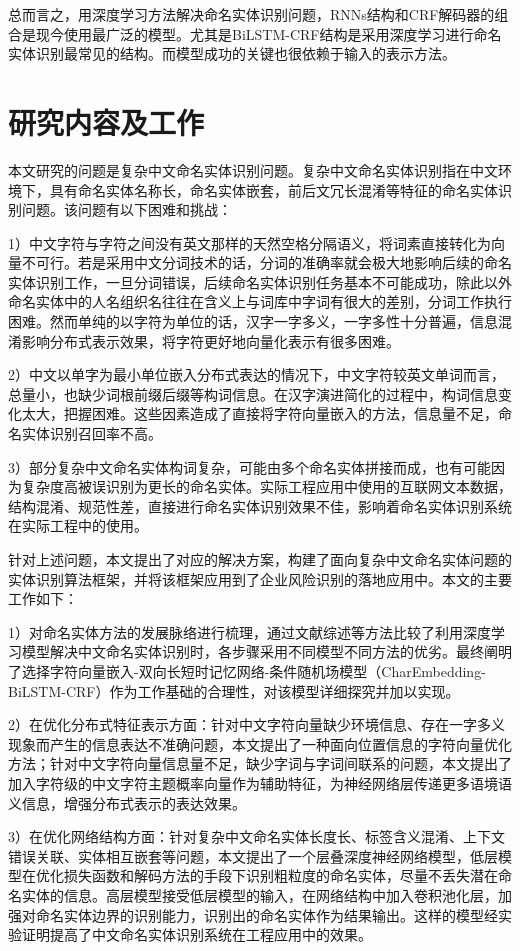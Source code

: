 \documentclass[winfonts,master,oneside,nobackinfo]{njuthesis}
\begin{document}
总而言之，用深度学习方法解决命名实体识别问题，RNNs结构和CRF解码器的组合是现今使用最广泛的模型。尤其是BiLSTM-CRF结构是采用深度学习进行命名实体识别最常见的结构。而模型成功的关键也很依赖于输入的表示方法。

\section{研究内容及工作}
本文研究的问题是复杂中文命名实体识别问题。复杂中文命名实体识别指在中文环境下，具有命名实体名称长，命名实体嵌套，前后文冗长混淆等特征的命名实体识别问题。该问题有以下困难和挑战：

1）中文字符与字符之间没有英文那样的天然空格分隔语义，将词素直接转化为向量不可行。若是采用中文分词技术的话，分词的准确率就会极大地影响后续的命名实体识别工作，一旦分词错误，后续命名实体识别任务基本不可能成功，除此以外命名实体中的人名组织名往往在含义上与词库中字词有很大的差别，分词工作执行困难。然而单纯的以字符为单位的话，汉字一字多义，一字多性十分普遍，信息混淆影响分布式表示效果，将字符更好地向量化表示有很多困难。

2）中文以单字为最小单位嵌入分布式表达的情况下，中文字符较英文单词而言，总量小，也缺少词根前缀后缀等构词信息。在汉字演进简化的过程中，构词信息变化太大，把握困难。这些因素造成了直接将字符向量嵌入的方法，信息量不足，命名实体识别召回率不高。

3）部分复杂中文命名实体构词复杂，可能由多个命名实体拼接而成，也有可能因为复杂度高被误识别为更长的命名实体。实际工程应用中使用的互联网文本数据，结构混淆、规范性差，直接进行命名实体识别效果不佳，影响着命名实体识别系统在实际工程中的使用。

针对上述问题，本文提出了对应的解决方案，构建了面向复杂中文命名实体问题的实体识别算法框架，并将该框架应用到了企业风险识别的落地应用中。本文的主要工作如下：

1）对命名实体方法的发展脉络进行梳理，通过文献综述等方法比较了利用深度学习模型解决中文命名实体识别时，各步骤采用不同模型不同方法的优劣。最终阐明了选择字符向量嵌入-双向长短时记忆网络-条件随机场模型（CharEmbedding-BiLSTM-CRF）作为工作基础的合理性，对该模型详细探究并加以实现。

2）在优化分布式特征表示方面：针对中文字符向量缺少环境信息、存在一字多义现象而产生的信息表达不准确问题，本文提出了一种面向位置信息的字符向量优化方法；针对中文字符向量信息量不足，缺少字词与字词间联系的问题，本文提出了加入字符级的中文字符主题概率向量作为辅助特征，为神经网络层传递更多语境语义信息，增强分布式表示的表达效果。

3）在优化网络结构方面：针对复杂中文命名实体长度长、标签含义混淆、上下文错误关联、实体相互嵌套等问题，本文提出了一个层叠深度神经网络模型，低层模型在优化损失函数和解码方法的手段下识别粗粒度的命名实体，尽量不丢失潜在命名实体的信息。高层模型接受低层模型的输入，在网络结构中加入卷积池化层，加强对命名实体边界的识别能力，识别出的命名实体作为结果输出。这样的模型经实验证明提高了中文命名实体识别系统在工程应用中的效果。
\end{document}
